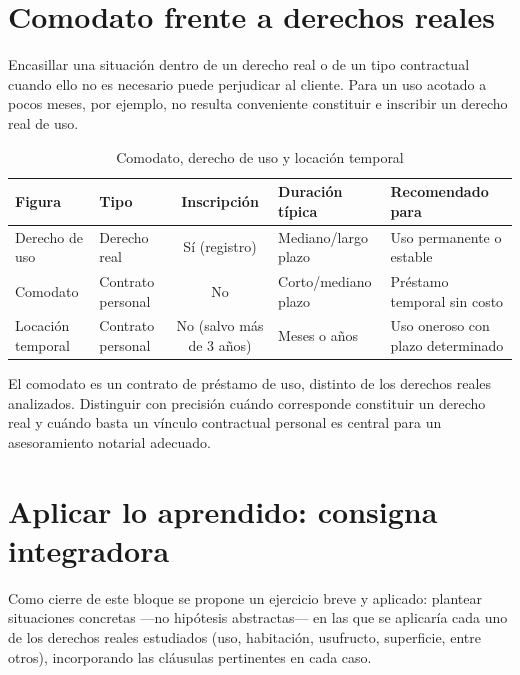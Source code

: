 \documentclass[12pt,oneside]{book}
\begin{document}
\section{Comodato frente a derechos reales}
\label{sec:comodato}

Encasillar una situación dentro de un derecho real o de un tipo contractual cuando ello no es necesario puede perjudicar al cliente. Para un uso acotado a pocos meses, por ejemplo, no resulta conveniente constituir e inscribir un derecho real de uso.

\begin{table}[H]
\centering
\caption{Comodato, derecho de uso y locación temporal}
\small
\renewcommand{\arraystretch}{1.2}
\begin{tabularx}{\textwidth}{>{\raggedright\arraybackslash}p{}>{\raggedright\arraybackslash}p{}c>{\raggedright\arraybackslash}X>{\raggedright\arraybackslash}X}
\toprule
\textbf{Figura} & \textbf{Tipo} & \textbf{Inscripción} & \textbf{Duración típica} & \textbf{Recomendado para} \\
\midrule
Derecho de uso & Derecho real & Sí (registro) & Mediano/largo plazo & Uso permanente o estable \\
Comodato & Contrato personal & No & Corto/mediano plazo & Préstamo temporal sin costo \\
Locación temporal & Contrato personal & No (salvo más de 3 años) & Meses o años & Uso oneroso con plazo determinado \\
\bottomrule
\end{tabularx}
\end{table}

\begin{note}
El comodato es un contrato de préstamo de uso, distinto de los derechos reales analizados. Distinguir con precisión cuándo corresponde constituir un derecho real y cuándo basta un vínculo contractual personal es central para un asesoramiento notarial adecuado.
\end{note}

\section{Aplicar lo aprendido: consigna integradora}

Como cierre de este bloque se propone un ejercicio breve y aplicado: plantear situaciones concretas ---no hipótesis abstractas--- en las que se aplicaría cada uno de los derechos reales estudiados (uso, habitación, usufructo, superficie, entre otros), incorporando las cláusulas pertinentes en cada caso.
\end{document}
